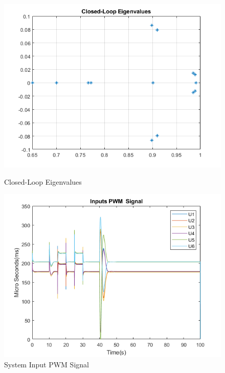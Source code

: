\documentclass[12pt,a4paper,twoside]{report}
\begin{document}
				\begin{figure}[h!]
					\centering
					\begin{minipage}{0.9\textwidth}
						\centering
						\includegraphics[width=1\linewidth]{DiscreteSystemPoles2.png}
						\caption{Closed-Loop Eigenvalues}
						\label{fig:closedloopeigenvalues}
					\end{minipage}\hfill
					\begin{minipage}{0.9\textwidth}
						\centering
						\includegraphics[width=1\textwidth]{LQGEKFInputs.png}	
						\caption{System Input PWM Signal}
						\label{fig:systeminputs}
					\end{minipage}\hfill
				\end{figure}
				
\end{document}

